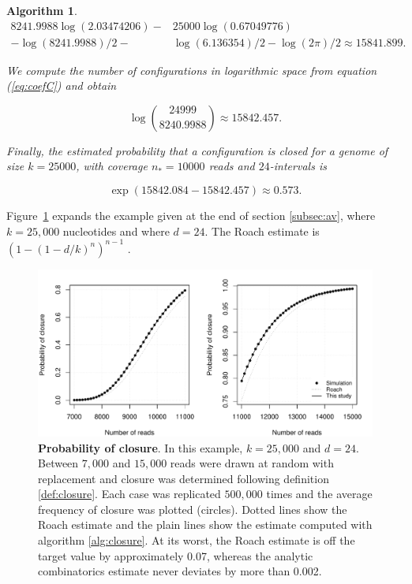 \documentclass{article}
\newtheorem{algorithm}{Algorithm}
\begin{document}
\begin{algorithm}
\begin{equation*}
\begin{split}
8241.9988\log(2.03474206) - &25000\log(0.67049776) \\
- \log(8241.9988)/2 - &\log(6.136354)/2 - \log(2\pi)/2
\approx 15841.899.
\end{split}
\end{equation*}

We compute the number of configurations in logarithmic space from equation
(\ref{eq:coefC}) and obtain

\begin{equation*}
\log { 24999 \choose 8240.9988 } \approx 15842.457.
\end{equation*}

Finally, the estimated probability that a configuration is closed for a
genome of size $k=25000$, with coverage $n_* = 10000$ reads and
$24$-intervals is

\begin{equation*}
\exp(15842.084-15842.457) \approx 0.573.
\end{equation*}


\end{algorithm}


Figure~\ref{fig:closureprob} expands the example given at the end of
section \ref{subsec:av}, where $k = 25,000$ nucleotides and where $d=24$.
The Roach estimate is $(1-(1-d/k)^n)^{n-1}$ \cite{pmid8808467}.

\begin{figure}[h]
\centering
\includegraphics[scale=0.585]{Fig4.pdf}
\caption{\textbf{Probability of closure}. In this example, $k=25,000$ and
$d=24$. Between $7,000$ and $15,000$ reads were drawn at random with
replacement and closure was determined following definition
\ref{def:closure}. Each case was replicated $500,000$ times and the
average frequency of closure was plotted (circles). Dotted lines show the
Roach estimate and the plain lines show the estimate computed with
algorithm \ref{alg:closure}. At its worst, the Roach estimate is off the
target value by approximately 0.07, whereas the analytic combinatorics
estimate never deviates by more than 0.002.}
\label{fig:closureprob}
\end{figure}
\end{document}

